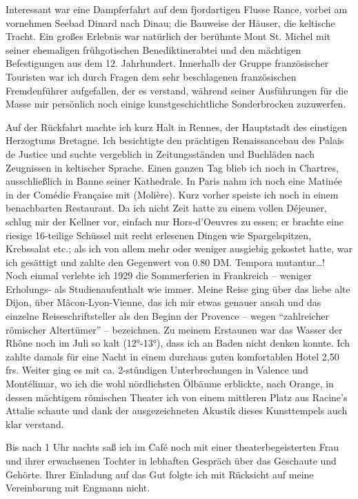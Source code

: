 Interessant war eine Dampferfahrt auf dem fjordartigen Flusse Rance, vorbei am vornehmen Seebad Dinard nach Dinau; die Bauweise der Häuser, die keltische Tracht. Ein großes Erlebnis war natürlich der berühmte Mont St. Michel mit seiner ehemaligen frühgotischen Benediktinerabtei und den mächtigen Befestigungen aus dem 12. Jahrhundert. Innerhalb der Gruppe französischer Touristen war ich durch Fragen dem sehr beschlagenen französischen Fremdenführer aufgefallen, der es verstand, während seiner Ausführungen für die Masse mir persönlich noch einige kunstgeschichtliche Sonderbrocken zuzuwerfen.

Auf der Rückfahrt machte ich kurz Halt in Rennes, der Hauptstadt des einstigen Herzogtums Bretagne. Ich besichtigte den prächtigen Renaissancebau des Palais de Justice und suchte vergeblich in Zeitungsständen und Buchläden nach Zeugnissen in keltischer Sprache. Einen ganzen Tag blieb ich noch in Chartres, ausschließlich in Banne seiner Kathedrale. In Paris nahm ich noch eine Matinée in der Comédie Française mit (Molière). Kurz vorher speiste ich noch in einem benachbarten Restaurant. Da ich nicht Zeit hatte zu einem vollen Déjeuner, schlug mir der Kellner vor, einfach nur Hors-d'Oeuvres zu essen; er brachte eine riesige 16-teilige Schüssel mit recht erlesenen Dingen wie Spargelspitzen, Krebssalat etc.; als ich von allem mehr oder weniger ausgiebig gekostet hatte, war ich gesättigt und zahlte den Gegenwert von 0.80 DM. Tempora mutantur\dots!\\

Noch einmal verlebte ich 1929 die Sommerferien in Frankreich -- weniger Erholungs- als Studienaufenthalt wie immer. Meine Reise ging über das liebe alte Dijon, über Mâcon-Lyon-Vienne, das ich mir etwas genauer ansah und das einzelne Reiseschriftsteller als den Beginn der Provence -- wegen \enquote{zahlreicher römischer Altertümer} -- bezeichnen. Zu meinem Erstaunen war das Wasser der Rhône noch im Juli so kalt (12°-13°), dass ich an Baden nicht denken konnte. Ich zahlte damals für eine Nacht in einem durchaus guten komfortablen Hotel 2,50 frs. Weiter ging es mit ca. 2-stündigen Unterbrechungen in Valence und Montélimar, wo ich die wohl nördlichsten Ölbäume erblickte, nach Orange, in dessen mächtigem römischen Theater ich von einem mittleren Platz aus Racine's Attalie schaute und dank der ausgezeichneten Akustik dieses Kunsttempels auch klar verstand.

Bis nach 1 Uhr nachts saß ich im Café noch mit einer theaterbegeisterten Frau und ihrer erwachsenen Tochter in lebhaften Gespräch über das Geschaute und Gehörte. Ihrer Einladung auf das Gut folgte ich mit Rücksicht auf meine Vereinbarung mit Engmann nicht.

